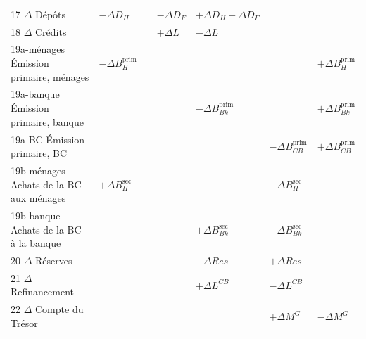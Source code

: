 \documentclass{article}
\begin{document}
\begin{longtable}{lllllll}
17 $\Delta$ Dépôts & $-\Delta D_H$ & & $-\Delta D_F$ & $+\Delta D_H + \Delta D_F$ & & \\
18 $\Delta$ Crédits & & & $+\Delta L$ & $-\Delta L$ & & \\
19a-ménages Émission primaire, ménages & $-\Delta B_H^{\mathrm{prim}}$ & & & & & $+\Delta B_H^{\mathrm{prim}}$\\
19a-banque Émission primaire, banque & & & & $-\Delta B_{Bk}^{\mathrm{prim}}$ & & $+\Delta B_{Bk}^{\mathrm{prim}}$\\
19a-BC Émission primaire, BC & & & & & $-\Delta B_{CB}^{\mathrm{prim}}$ & $+\Delta B_{CB}^{\mathrm{prim}}$\\
19b-ménages Achats de la BC aux ménages & $+\Delta B_H^{\mathrm{sec}}$ & & & & $-\Delta B_H^{\mathrm{sec}}$ & \\
19b-banque Achats de la BC à la banque & & & & $+\Delta B_{Bk}^{\mathrm{sec}}$ & $-\Delta B_{Bk}^{\mathrm{sec}}$ & \\
20 $\Delta$ Réserves & & & & $-\Delta \mathit{Res}$ & $+\Delta \mathit{Res}$ & \\
21 $\Delta$ Refinancement & & & & $+\Delta L^{CB}$ & $-\Delta L^{CB}$ & \\
22 $\Delta$ Compte du Trésor & & & & & $+\Delta M^G$ & $-\Delta M^G$\\
\end{longtable}
\end{document}
